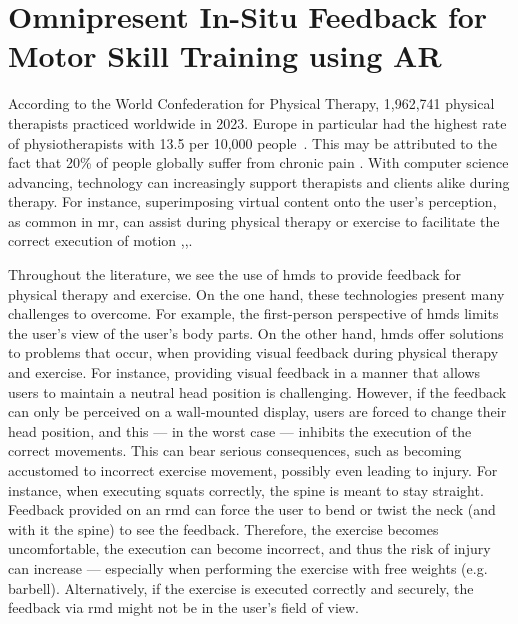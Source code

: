 

\chapter{Omnipresent In-Situ Feedback for Motor Skill Training using AR \label{chap:omnipresent}}
According to the World Confederation for Physical Therapy, 1,962,741 physical therapists practiced worldwide in 2023. Europe in particular had the highest rate of physiotherapists with 13.5 per 10,000 people~\cite{worldphysiotherapy2023global}. This may be attributed to the fact that 20\% of people globally suffer from chronic pain \cite{treede2015classification}. With computer science advancing, technology can increasingly support therapists and clients alike during therapy. For instance, superimposing virtual content onto the user's perception, as common in \acrshort{mr}, can assist during physical therapy or exercise to facilitate the correct execution of motion \cite{brepohl2023virtual},\cite{campo2021immersive},\cite{diller2022vcb}.

Throughout the literature, we see the use of \acrshort{hmd}s to provide feedback for physical therapy and exercise. On the one hand, these technologies present many challenges to overcome. For example, the first-person perspective of \acrshort{hmd}s limits the user’s view of the user's body parts. On the other hand, \acrshort{hmd}s offer solutions to problems that occur, when providing visual feedback during physical therapy and exercise. For instance, providing visual feedback in a manner that allows users to maintain a neutral head position is challenging. However, if the feedback can only be perceived on a wall-mounted display, users are forced to change their head position, and this --- in the worst case --- inhibits the execution of the correct movements. This can bear serious consequences, such as becoming accustomed to incorrect exercise movement, possibly even leading to injury. For instance, when executing squats correctly, the spine is meant to stay straight. Feedback provided on an \acrshort{rmd} can force the user to bend or twist the neck (and with it the spine) to see the feedback. Therefore, the exercise becomes uncomfortable, the execution can become incorrect, and thus the risk of injury can increase --- especially when performing the exercise with free weights (e.g. barbell). Alternatively, if the exercise is executed correctly and securely, the feedback via \acrshort{rmd} might not be in the user's field of view.

